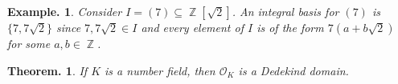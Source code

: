 \documentclass[11pt, a4paper]{memoir}
\DeclareMathOperator{\Z}{{\mathbb{Z}}}
\theoremstyle{change}
\newtheorem{theorem}{Theorem.}[section]
\theoremstyle{plain}
\theoremstyle{nonumberplain}
\newtheorem{example}{Example.}
\newtheorem{proof}{Proof}
\newcommand{\quot}[2]{\mathchoice{\left.\raisebox{0.07em}{$#1$}\middle/\raisebox{-0.07em}{$#2$}\right.}
                                 {\left.\raisebox{0.03em}{$#1$}\middle/\raisebox{-0.03em}{$#2$}\right.}
                                 {\left.\raisebox{0.00em}{$#1$}\middle/\raisebox{-0.00em}{$#2$}\right.}
                                 {\left.\raisebox{0em}{$#1$}\middle/\raisebox{0em}{$#2$}\right.}}
\numberwithin{equation}{section}
\begin{document}
\begin{example}
    Consider $I=(7)\subseteq\Z[\sqrt{2}]$.
    An integral basis for $(7)$ is $\{7,7\sqrt{2}\}$ since $7,7\sqrt{2}\in I$ and every element of $I$ is of the form $7(a+b\sqrt{2})$ for some $a,b\in\Z$.
\end{example}
\begin{theorem}
    If $K$ is a number field, then $\mathcal{O}_K$ is a Dedekind domain.
\end{theorem}
\end{document}

